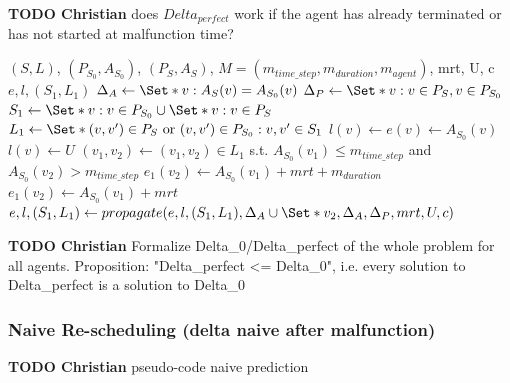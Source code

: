 \documentclass{article}
\begin{document}
\begin{mdframed}
{\bf TODO Christian} does $Delta_{perfect}$ work if the agent has already terminated or has not started at malfunction time?
\end{mdframed}


\begin{algorithm}
	\caption{$Delta_{perfect}$} \label{algo:Deltaperfect}
	\begin{algorithmic}[1]
		\Require $(S,L)$, $(P_{S_0},A_{S_0})$, $(P_S,A_S)$, $M=(m_{time\_step},m_{duration},m_{agent})$, mrt, U, c
	    \Ensure $e,l,(S_1,L_1)$
	    \State $\Delta_A \leftarrow \Set*{v: A_S(v)=A_{S_0}(v)}$
	    \State $\Delta_P \leftarrow \Set*{v: v\in P_S, v\in P_{S_0}}$
	    \State $S_1 \leftarrow \Set*{v: v\in P_{S_0}} \cup \Set*{v: v\in P_{S}}$
	    \State $L_1 \leftarrow \Set*{(v,v^\prime) \in P_S \textrm{ or } (v,v^\prime) \in P_{S_0}: v,v^\prime \in S_1}$
	        \State $l(v)\leftarrow e(v)\leftarrow A_{S_0}(v)$
	    \EndFor
	        \State $l(v) \leftarrow U$
	    \EndFor
	    \State $(v_1,v_2) \leftarrow (v_1,v_2) \in L_1$ s.t. $A_{S_0}(v_1)\leq m_{time\_step}$ and $A_{S_0}(v_2)>m_{time\_step}$
            \State $e_1(v_2) \leftarrow A_{S_0}(v_1)+mrt+m_{duration}$
        \Else
            \State $e_1(v_2) \leftarrow A_{S_0}(v_1)+mrt$
        \EndIf
        \EndIf
	    \State $e,l,(S_1,L_1) \leftarrow propagate(e,l,(S_1,L_1),\Delta_A \cup \Set*{v_2}, \Delta_A, \Delta_P, mrt, U, c)$
	\end{algorithmic} 
\end{algorithm}

\begin{mdframed}
{\bf TODO Christian}
Formalize Delta\_0/Delta\_perfect of the whole problem for all agents. 
Proposition: "Delta\_perfect <= Delta\_0", i.e. every solution to Delta\_perfect is a solution to Delta\_0
\end{mdframed}


\subsubsection{Naive Re-scheduling (delta naive after malfunction)}\label{subsubsec:Deltanaive}

\begin{mdframed}
{\bf TODO Christian} pseudo-code naive prediction
\end{mdframed}
\end{document}
